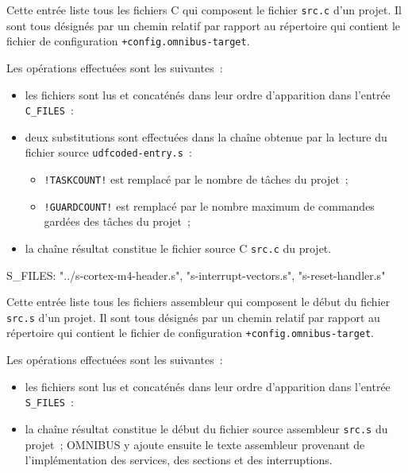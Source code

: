 Cette entrée liste tous les fichiers C qui composent le fichier \texttt{src.c} d'un projet. Il sont tous désignés par un chemin relatif par rapport au répertoire qui contient le fichier de configuration \texttt{+config.omnibus-target}.

Les opérations effectuées sont les suivantes~:
\begin{itemize}
  \item les fichiers sont lus et concaténés dans leur ordre d'apparition dans l'entrée \texttt{C\_FILES}~:
  \item deux substitutions sont effectuées dans la chaîne obtenue par la lecture du fichier source \texttt{udfcoded-entry.s}~:
  \begin{itemize}
    \item \texttt{!TASKCOUNT!} est remplacé par le nombre de tâches du projet~;
    \item \texttt{!GUARDCOUNT!} est remplacé par le nombre maximum de commandes gardées des tâches du projet~;
  \end{itemize}
  \item la chaîne résultat constitue le fichier source C \texttt{src.c} du projet.
\end{itemize}







\begin{OMNIBUS}
S_FILES:
  "../s-cortex-m4-header.s",
  "s-interrupt-vectors.s",
  "s-reset-handler.s"
\end{OMNIBUS}

Cette entrée liste tous les fichiers assembleur qui composent le début du fichier \texttt{src.s} d'un projet. Il sont tous désignés par un chemin relatif par rapport au répertoire qui contient le fichier de configuration \texttt{+config.omnibus-target}.

Les opérations effectuées sont les suivantes~:
\begin{itemize}
  \item les fichiers sont lus et concaténés dans leur ordre d'apparition dans l'entrée \texttt{S\_FILES}~:
  \item la chaîne résultat constitue le début du fichier source assembleur \texttt{src.s} du projet~; OMNIBUS y ajoute ensuite le texte assembleur provenant de l'implémentation des services, des sections et des interruptions.
\end{itemize}












